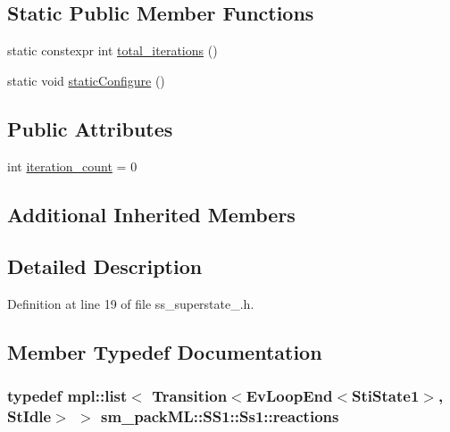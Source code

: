 \subsection*{Static Public Member Functions}
\begin{DoxyCompactItemize}
\item 
static constexpr int \hyperlink{structsm__packML_1_1SS1_1_1Ss1_a2a475a2d1777573f55de08923b1c9816}{total\+\_\+iterations} ()
\item 
static void \hyperlink{structsm__packML_1_1SS1_1_1Ss1_a37c64d94b19e5522a60c4e47cbd4a3a0}{static\+Configure} ()
\end{DoxyCompactItemize}
\subsection*{Public Attributes}
\begin{DoxyCompactItemize}
\item 
int \hyperlink{structsm__packML_1_1SS1_1_1Ss1_a849076870adaf8bbb9a1b25a8a9c210f}{iteration\+\_\+count} = 0
\end{DoxyCompactItemize}
\subsection*{Additional Inherited Members}


\subsection{Detailed Description}


Definition at line 19 of file ss\+\_\+superstate\+\_.\+h.



\subsection{Member Typedef Documentation}
\subsubsection[{\texorpdfstring{reactions}{reactions}}]{\setlength{\rightskip}{0pt plus 5cm}typedef mpl\+::list$<$ Transition$<$Ev\+Loop\+End$<${\bf Sti\+State1}$>$, {\bf St\+Idle}$>$ $>$ {\bf sm\+\_\+pack\+M\+L\+::\+S\+S1\+::\+Ss1\+::reactions}}\hypertarget{structsm__packML_1_1SS1_1_1Ss1_a1a3f9a298464fde020614c7e0f21c57e}{}\label{structsm__packML_1_1SS1_1_1Ss1_a1a3f9a298464fde020614c7e0f21c57e}


